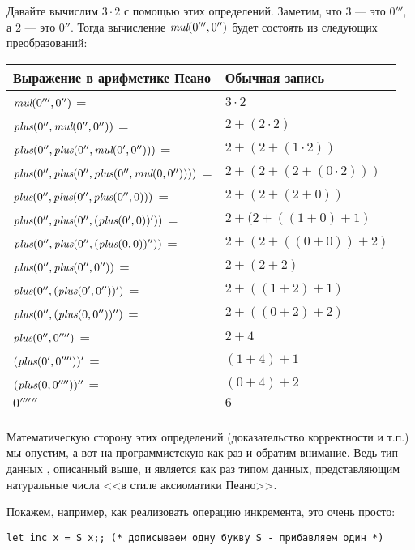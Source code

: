 \begin{example}
Давайте вычислим $3 \cdot 2$ с помощью этих определений. 
Заметим, что 3 --- это $0'''$, а 2 --- это $0''$. Тогда вычисление
$\textit{mul} (0''', 0'')$ будет состоять из следующих преобразований:

\begin{tabular}{ll}\\
\hline
Выражение в арифметике Пеано&Обычная запись\\
\hline
  $\textit{mul} (0''', 0'')$ = & $3 \cdot 2$\\
  $\textit{plus} (0'', \textit{mul} (0'', 0''))$ = & $2 + (2\cdot 2)$\\
  $\textit{plus} (0'', \textit{plus} (0'', \textit{mul} (0', 0'')))$ = & $2 + (2 + (1\cdot 2))$\\
  $\textit{plus} (0'', \textit{plus} (0'', \textit{plus} (0'', \textit{mul} (0, 0''))))$ = & $2 + (2 + (2 + (0\cdot 2)))$\\
  $\textit{plus} (0'', \textit{plus} (0'', \textit{plus} (0'', 0)))$ = & $2 + (2 + (2 + 0))$\\
  $\textit{plus} (0'', \textit{plus} (0'', (\textit{plus} (0', 0))'))$ = & $2 + (2 + ((1 + 0) + 1)$\\
  $\textit{plus} (0'', \textit{plus} (0'', (\textit{plus} (0, 0))''))$ = & $2 + (2 + ((0 + 0)) + 2)$\\
  $\textit{plus} (0'', \textit{plus} (0'', 0''))$ = & $2 + (2 + 2)$\\
  $\textit{plus} (0'', (\textit{plus} (0', 0''))')$ = & $2 + ((1 + 2) + 1)$\\
  $\textit{plus} (0'', (\textit{plus} (0, 0''))'')$ = & $2 + ((0 + 2) + 2)$\\
  $\textit{plus} (0'', 0'''')$ = & $2 + 4$\\
  $(\textit{plus} (0', 0''''))'$ = & $(1 + 4) + 1$\\
  $(\textit{plus} (0, 0''''))''$ = & $(0 + 4) + 2$\\
  $0''''''$ & $6$\\
\hline\\
\end{tabular}
\end{example}

Математическую сторону этих определений (доказательство корректности и т.п.)
мы опустим, а вот на программистскую как раз и обратим внимание.
Ведь тип данных , описанный выше, и является как раз типом данных,
представляющим натуральные числа <<в стиле аксиоматики Пеано>>.

Покажем, например, как реализовать операцию инкремента, это очень просто:
\begin{verbatim}
let inc x = S x;; (* дописываем одну букву S - прибавляем один *)
\end{verbatim}

